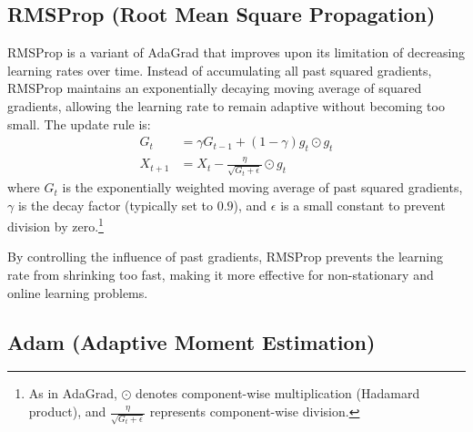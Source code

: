 \subsection{RMSProp (Root Mean Square Propagation)}
\label{subsec:ch5-rmsprop}

RMSProp is a variant of AdaGrad that improves upon its limitation of decreasing learning rates over time. Instead of accumulating all past squared gradients, RMSProp maintains an exponentially decaying moving average of squared gradients, allowing the learning rate to remain adaptive without becoming too small. The update rule is:
\begin{align}
G_t &= \gamma G_{t-1} + (1 - \gamma) g_t \odot g_t \label{eq:ch5-rmsprop-accum}\\
X_{t+1} &= X_t - \frac{\eta}{\sqrt{G_t + \epsilon}} \odot g_t \label{eq:ch5-rmsprop-update}
\end{align}
where $G_t$ is the exponentially weighted moving average of past squared gradients, $\gamma$ is the decay factor (typically set to $0.9$), and $\epsilon$ is a small constant to prevent division by zero.\footnote{As in AdaGrad, $\odot$ denotes component-wise multiplication (Hadamard product), and $\frac{\eta}{\sqrt{G_t+\epsilon}}$ represents component-wise division.}

By controlling the influence of past gradients, RMSProp prevents the learning rate from shrinking too fast, making it more effective for non-stationary and online learning problems.

\subsection{Adam (Adaptive Moment Estimation)}
\label{subsec:ch5-adam}

